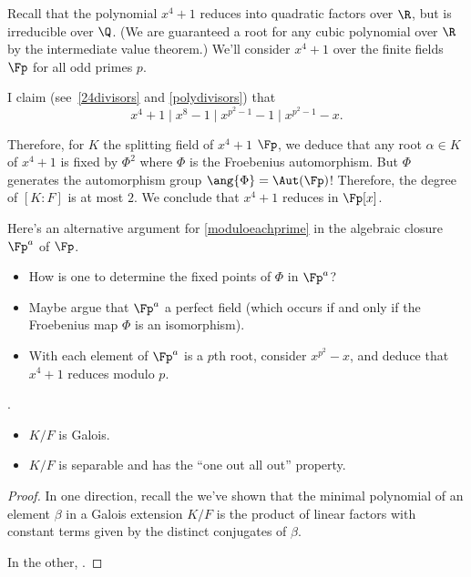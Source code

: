 \begin{ex}
    \label{moduloeachprime}
    
    Recall that the polynomial $x^4 +1$ reduces into quadratic factors over $\R$, but is irreducible over $\Q$. (We are guaranteed a root for any cubic polynomial over $\R$ by the intermediate value theorem.) We'll consider $x^4 + 1$ over the finite fields $\Fp$ for all odd primes $p$.
   
    I claim (see~\ref{24divisors} and \ref{polydivisors}) that
    \[
        x^4 + 1 \mid x^8 -1 \mid x^{p^2 -1} -1 \mid x^{p^2-1} -x
    .\]

    Therefore, for $K$ the splitting field of $x^4 + 1$ $\Fp$, we deduce that any root $\alpha \in K$ of $x^4 +1 $ is fixed by $\Phi^2$ where $\Phi$ is the Froebenius automorphism.
    But $\Phi$ generates the automorphism group $\ang{\Phi} = \Aut(\Fp)$! Therefore, the degree of $[K:F]$ is at most $2$. We conclude that $x^4 +1$ reduces in $\Fp[x]$.
\end{ex}

\begin{ex}[]
    Here's an alternative argument for \ref{moduloeachprime} in the algebraic closure $\Fp^a$ of $\Fp$.
    \begin{itemize}
        \item How is one to determine the fixed points of $\Phi$ in $\Fp^a$?
        \item Maybe argue that $\Fp^a$ a perfect field (which occurs if and only if the Froebenius map $\Phi$ is an isomorphism).
        \item With each element of $\Fp^a$ is a $p$th root, consider $x^{p^2} -x$, and deduce that $x^4 +1$ reduces modulo $p$.
    \end{itemize}
\end{ex}

\begin{prop}[] \TFAE.
\begin{itemize}
    \item $K/F$ is Galois.
    \item $K/F$ is separable and has the ``one out all out'' property.
\end{itemize}

\begin{proof}
In one direction, recall the we've shown that the minimal polynomial of an element $\beta$ in a Galois extension $K/F$ is the product of linear factors with constant terms given by the distinct conjugates of $\beta$.

In the other, \TODO.
\end{proof}
\end{prop}

